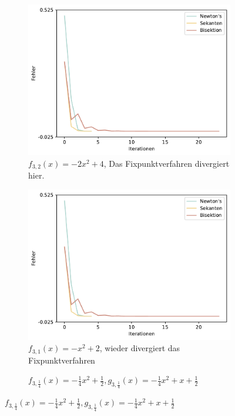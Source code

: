 \documentclass[a4paper,12pt]{article}
\newcommand{\1}{1\hspace{-0,9ex}1}
\begin{document}
\begin{figure}[!h]
	\begin{subfigure}[b]{0.4\textwidth}
		\caption*{$f_{3,2}(x) = -2x^2 + 4$, Das Fixpunktverfahren divergiert hier.}
		\includegraphics[width=\textwidth]{plots/error_series_plot(2).pdf}
	\end{subfigure}
	\begin{subfigure}[b]{0.4\textwidth}
		\caption*{$f_{3,1}(x) = -x^2 + 2$, wieder divergiert das Fixpunktverfahren}
		\includegraphics[width=\textwidth]{plots/error_series_plot(3).pdf}
	\end{subfigure}
	\begin{subfigure}[b]{0.4\textwidth}
		\caption*{$f_{3,\frac{1}{4}}(x) = -\frac{1}{4}x^2 +\frac{1}{2},  g_{3,\frac{1}{4}}(x)=-\frac{1}{4}x^2 + x + \frac{1}{2}$}

\end{subfigure}
\end{figure}
\end{document}
